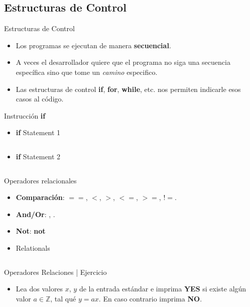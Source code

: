 \documentclass[usenames, dvipsnames, compress]{beamer}
\begin{document}
	\subsection{Estructuras de Control}
	\begin{frame}{Estructuras de Control}
		\begin{itemize}[<+- | alert@ +>]{}
			\item Los programas se ejecutan de manera \textbf{secuencial}.
			\item A veces el desarrollador quiere que el programa no siga una secuencia específica sino que tome un \textit{camino} especifico.
			\item Las estructuras de control \textbf{if}, \textbf{for}, \textbf{while}, etc. nos permiten indicarle esos casos al código. 
		\end{itemize}
	\end{frame}
	\begin{frame}[allowframebreaks]{Instrucción \textbf{if}}
	\begin{itemize}
		\item [] \begin{block}{\textbf{if} Statement 1}
			\inputminted[xleftmargin=\parindent,linenos]{python}{codes/if_statement.m}
		\end{block}
		\pause
		\item [] \begin{block}{\textbf{if} Statement 2}
			\inputminted[xleftmargin=\parindent,linenos]{python}{codes/if_statement2.m}
		\end{block}
	\end{itemize}
	\end{frame}
	\begin{frame}{Operadores relacionales}
	\begin{itemize}
		\item \textbf{Comparación}: $==$, $<$, $>$, $<=$, $>=$, $!=$.
		\pause
		\item \textbf{And/Or}: , .
		\pause
		\item \textbf{Not}: \textbf{not}
		\pause
		\item [] \begin{block}{Relationals}
			\inputminted[xleftmargin=\parindent,linenos]{python}{codes/relational.m}
		\end{block}
	\end{itemize}
	\end{frame}
	\begin{frame}{Operadores Relaciones | Ejercicio}
		\begin{itemize}
		\item Lea dos valores $x$, $y$ de la entrada estándar e imprima \textbf{YES} si existe algún valor $a \in \mathbb{Z} $, tal qué $y = ax$. En caso contrario imprima \textbf{NO}.
		\end{itemize}
	\end{frame}
\end{document}
